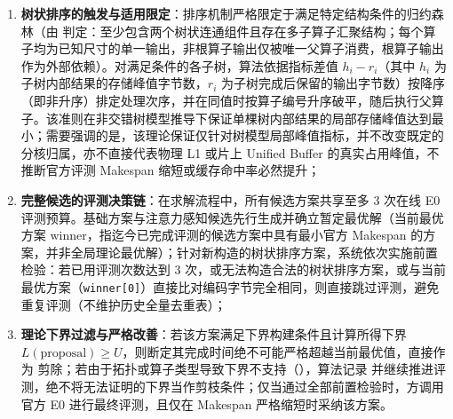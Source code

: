 \documentclass[anonymous,withtoc]{gmcm2026}
\providecommand{\tightlist}{\setlength{\itemsep}{0pt}\setlength{\parskip}{0pt}}
\begin{document}
\begin{enumerate}
\def\labelenumi{\arabic{enumi}.}
\tightlist
\item
  \textbf{树状排序的触发与适用限定}：排序机制严格限定于满足特定结构条件的归约森林（由 \texttt{} 判定：至少包含两个树状连通组件且存在多子算子汇聚结构；每个算子均为已知尺寸的单一输出，非根算子输出仅被唯一父算子消费，根算子输出作为外部依赖）。对满足条件的各子树，算法依据指标差值 \(h_i - r_i\)（其中 \(h_i\) 为子树内部结果的存储峰值字节数，\(r_i\) 为子树完成后保留的输出字节数）按降序（即非升序）排定处理次序，并在同值时按算子编号升序破平，随后执行父算子。该准则在非交错树模型推导下保证单棵树内部结果的局部存储峰值达到最小；需要强调的是，该理论保证仅针对树模型局部峰值指标，并不改变既定的分核归属，亦不直接代表物理 L1 或片上 Unified Buffer 的真实占用峰值，不推断官方评测 Makespan 缩短或缓存命中率必然提升；
\item
  \textbf{完整候选的评测决策链}：在求解流程中，所有候选方案共享至多 3 次在线 E0 评测预算。基础方案与注意力感知候选先行生成并确立暂定最优解（当前最优方案 \(\mathrm{winner}\)，指迄今已完成评测的候选方案中具有最小官方 Makespan 的方案，并非全局理论最优解）；针对新构造的树状排序方案，系统依次实施前置检验：若已用评测次数达到 3 次，或无法构造合法的树状排序方案，或与当前最优方案（\texttt{winner{[}0{]}}）直接比对编码字节完全相同，则直接跳过评测，避免重复评测（不维护历史全量去重表）；
\item
  \textbf{理论下界过滤与严格改善}：若该方案满足下界构建条件且计算所得下界 \(L(\text{proposal}) \ge U\)，则断定其完成时间绝不可能严格超越当前最优值，直接作为 \texttt{} 剪除；若由于拓扑或算子类型导致下界不支持（\texttt{}），算法记录 \texttt{} 并继续推进评测，绝不将无法证明的下界当作剪枝条件；仅当通过全部前置检验时，方调用官方 E0 进行最终评测，且仅在 Makespan 严格缩短时采纳该方案。
\end{enumerate}
\end{document}
